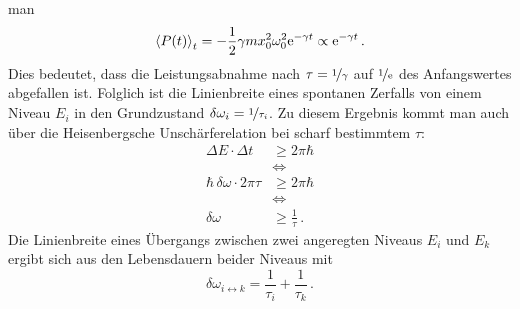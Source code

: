 man
\begin{equation}\label{eq:klassischer_oszillator_leistung_02}
	\left\langle P(t)\right\rangle_t=-\frac{1}{2}\gamma mx_0^2\omega_0^2\mathrm{e}^{-\gamma
	t}\propto\mathrm{e}^{-\gamma
	t}\,.
\end{equation}
Dies bedeutet, dass die Leistungsabnahme nach $\tau=\nicefrac{1}{\gamma}$ auf
$\nicefrac{1}{\mathrm{e}}$ des Anfangswertes abgefallen ist. Folglich ist die
Linienbreite eines spontanen Zerfalls von einem Niveau $E_i$ in den Grundzustand
$\delta\omega_i=\nicefrac{1}{\tau_i}$. Zu diesem Ergebnis kommt man auch über
die Heisenbergsche Unschärferelation bei scharf bestimmtem $\tau$:
\begin{equation}\label{eq:unschaerferelation}
	\begin{split}
		\Delta E\cdot\Delta t &\geq2\pi\hbar\\
		&\Leftrightarrow\\
		\hbar\,\delta\omega\cdot2\pi\tau &\geq2\pi\hbar\\
		&\Leftrightarrow\\
		\delta\omega &\geq\frac{1}{\tau}\,.
	\end{split}
\end{equation}
Die Linienbreite eines Übergangs zwischen
zwei angeregten Niveaus $E_i$ und $E_k$ ergibt sich aus den Lebensdauern beider Niveaus mit
\begin{equation}\label{eq:natuerliche_linienbreite_lebensdauern}
	\delta\omega_{i\leftrightarrow
	k}=\frac{1}{\tau_i}+\frac{1}{\tau_k}\,.
\end{equation}

